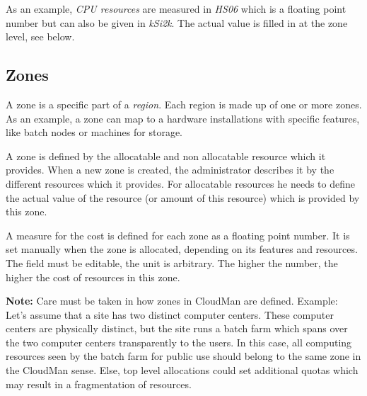 As an example, {\it CPU resources} are measured in {\it HS06} which is a floating point number but can also be given in {\it kSi2k}. 
The actual value is filled in at the zone level, see below.

\subsection{Zones}
A zone is a specific part of a {\it region}. Each region is made up of one or more zones. As an example, a zone can map to a hardware installations with specific features, like batch nodes or machines for storage. 

A zone is defined by the allocatable and non allocatable resource which it provides. 
When a new zone is created, the administrator describes it by the different resources which it provides. For allocatable resources he needs to define the actual value of the resource (or amount of this resource) which is provided by this zone. 

A measure for the cost is defined for each zone as a floating point number. 
It is set manually when the zone is allocated, depending on its features and resources. The field must be editable, the unit is arbitrary. The higher the number, the higher the cost of resources in this zone.

{\bf Note:} Care must be taken in how zones in CloudMan are defined. Example: Let's assume that a site has two distinct computer centers. These computer centers are physically distinct, but the site runs a batch farm which spans over the two computer centers transparently to the users. In this case, all computing resources seen by the batch farm for public use should belong to the same zone in the CloudMan sense. Else, top level allocations could set additional quotas which may result in a fragmentation of resources. 

